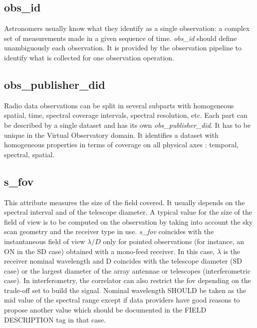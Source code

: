 \documentclass[11pt,a4paper]{ivoa}
\begin{document}
\subsection{obs\_id}

Astronomers usually know what they identify as a single observation: a complex set of
measurements made in a given sequence of time. \emph{obs\_id} should define unambiguously each
observation. It is provided by the observation pipeline to identify what is collected for one observation operation.

\subsection{obs\_publisher\_did}

Radio data observations can be split in several subparts with homogeneous spatial,
time, spectral coverage intervals, spectral resolution, etc. Each part can be described by
a single dataset and has its own \emph{obs\_publisher\_did}. It has to be unique in the
Virtual Observatory domain.
It identifies a dataset with homogeneous properties in terms of coverage on all physical axes : temporal, spectral, spatial.

\subsection{s\_fov}
\label{sec:fov}
This attribute measures the size of the field covered. 
It usually depends on the spectral interval and of the telescope diameter.
A typical value for  the size of the field of view is to be computed on the observation by taking into account the sky scan geometry and the receiver type in use.
\emph{s\_fov } coincides with the instantaneous field of view $\lambda / D$ only for pointed observations (for instance, an ON in the SD case) obtained with a mono-feed receiver. In this case, $\lambda$ is the
receiver nominal wavelength and D coincides with the telescope diameter (SD case) or the largest diameter of the array antennae or telescopes (interferometric case).
In interferometry, the correlator can also restrict the fov depending on the trade-off set to build the signal. 
Nominal wavelength SHOULD be taken as the mid value of the spectral range except if data providers have good reasons to propose another value which should be documented in the FIELD DESCRIPTION tag in that case. 
\end{document}
